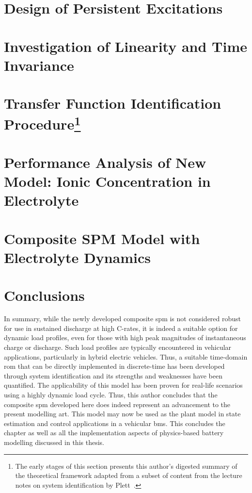 \section{Design of Persistent Excitations}\label{sec:persistentexcitation}


\section{Investigation of Linearity and Time Invariance}\label{sec:lticheck}


\section[Transfer Function Identification Procedure]{Transfer Function Identification Procedure\footnote{The early stages of this section presents this author's digested summary of the theoretical framework adapted from a subset of content from the lecture notes on system identification by Plett~\cite{PlettECE5560_02,PlettECE5560_03,PlettECE5560_04}.}}\label{sec:actualsysid}


\section{Performance Analysis of New Model: Ionic Concentration in Electrolyte}\label{sec:perfanalysisnewmodel}


\section{Composite SPM Model with Electrolyte Dynamics}


\section{Conclusions}
In  summary, while  the newly  developed composite  \gls{spm} is  not considered
robust for use in  sustained discharge at high C-rates, it  is indeed a suitable
option for  dynamic load profiles, even  for those with high  peak magnitudes of
instantaneous charge or discharge. Such  load profiles are typically encountered
in vehicular  applications, particularly  in hybrid  electric vehicles.  Thus, a
suitable time-domain \gls{rom} that can be directly implemented in discrete-time
has  been  developed  through  system   identification  and  its  strengths  and
weaknesses have been quantified. The applicability of this model has been proven
for real-life  scenarios using a  highly dynamic  load cycle. Thus,  this author
concludes that the  composite \gls{spm} developed here does  indeed represent an
advancement to  the present  modelling art. This  model may now  be used  as the
plant  model  in  state  estimation  and control  applications  in  a  vehicular
\gls{bms}. This concludes the chapter as  well as all the implementation aspects
of physics-based battery modelling discussed in this thesis.

